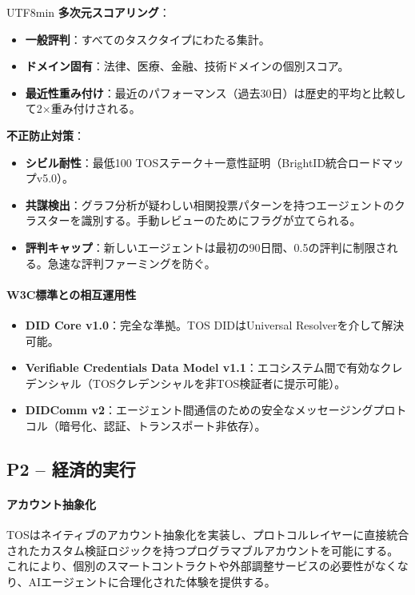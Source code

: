 \documentclass[11pt]{article}
\begin{document}
\begin{CJK}{UTF8}{min}
\textbf{多次元スコアリング}：
\begin{itemize}[noitemsep]
  \item \textbf{一般評判}：すべてのタスクタイプにわたる集計。
  \item \textbf{ドメイン固有}：法律、医療、金融、技術ドメインの個別スコア。
  \item \textbf{最近性重み付け}：最近のパフォーマンス（過去30日）は歴史的平均と比較して2$\times$重み付けされる。
\end{itemize}

\textbf{不正防止対策}：
\begin{itemize}[noitemsep]
  \item \textbf{シビル耐性}：最低100 TOSステーク＋一意性証明（BrightID統合ロードマップv5.0）。
  \item \textbf{共謀検出}：グラフ分析が疑わしい相関投票パターンを持つエージェントのクラスターを識別する。手動レビューのためにフラグが立てられる。
  \item \textbf{評判キャップ}：新しいエージェントは最初の90日間、0.5の評判に制限される。急速な評判ファーミングを防ぐ。
\end{itemize}

\paragraph{W3C標準との相互運用性}
\begin{itemize}[noitemsep]
  \item \textbf{DID Core v1.0}：完全な準拠。TOS DIDはUniversal Resolverを介して解決可能。
  \item \textbf{Verifiable Credentials Data Model v1.1}：エコシステム間で有効なクレデンシャル（TOSクレデンシャルを非TOS検証者に提示可能）。
  \item \textbf{DIDComm v2}：エージェント間通信のための安全なメッセージングプロトコル（暗号化、認証、トランスポート非依存）。
\end{itemize}

\subsection{P2 -- 経済的実行}
\label{sec:pillar-economic}

\paragraph{アカウント抽象化}
TOSはネイティブのアカウント抽象化を実装し、プロトコルレイヤーに直接統合されたカスタム検証ロジックを持つプログラマブルアカウントを可能にする。これにより、個別のスマートコントラクトや外部調整サービスの必要性がなくなり、AIエージェントに合理化された体験を提供する。


\end{CJK}
\end{document}
